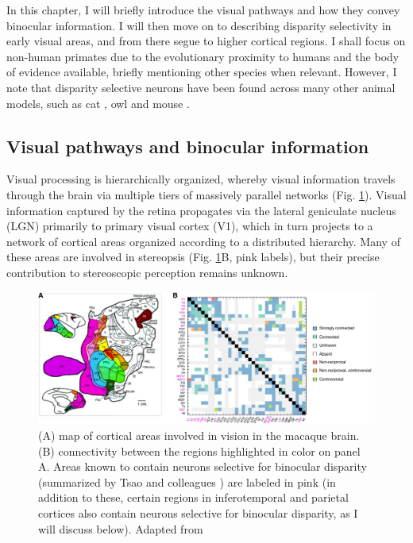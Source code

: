 In this chapter, I will briefly introduce the visual pathways and how they convey binocular information. I will then move on to describing disparity selectivity in early visual areas, and from there segue to higher cortical regions. I shall focus on non-human primates due to the evolutionary proximity to humans and the body of evidence available, briefly mentioning other species when relevant. However, I note that disparity selective neurons have been found across many other animal models, such as cat \cite{Barlow:1967bs}, owl \cite{Pettigrew:1976uq} and mouse \cite{Scholl:2013br}.

\subsection{Visual pathways and binocular information} \label{ssec:pathways}

Visual processing is hierarchically organized, whereby visual information travels through the brain via multiple tiers of massively parallel networks \cite{Felleman:1991kg} (Fig. \ref{fig:viscortex}). Visual information captured by the retina propagates via the lateral geniculate nucleus (LGN) primarily to primary visual cortex (V1), which in turn projects to a network of cortical areas organized according to a distributed hierarchy. Many of these areas are involved in stereopsis (Fig. \ref{fig:viscortex}B, pink labels), but their precise contribution to stereoscopic perception remains unknown.

\begin{figure}
  \centering
  \includegraphics[width=14cm, keepaspectratio]{visual-cortex}
  \caption[Distributed cortical hierarchy.]{(A) map of cortical areas involved in vision in the macaque brain. (B) connectivity between the regions highlighted in color on panel A. Areas known to contain neurons selective for binocular disparity (summarized by Tsao and colleagues \cite{Tsao:2003lk}) are labeled in pink (in addition to these, certain regions in inferotemporal and parietal cortices also contain neurons selective for binocular disparity, as I will discuss below). Adapted from \cite{Felleman:1991kg}}
  \label{fig:viscortex}
\end{figure}

